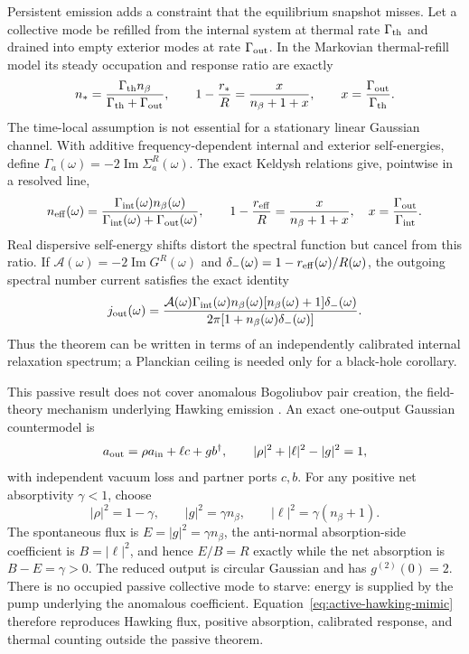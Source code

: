 \documentclass[12pt]{article}
\newcommand{\be}{\begin{equation}}
\newcommand{\ee}{\end{equation}}
\begin{document}
Persistent emission adds a constraint that the equilibrium snapshot
misses.  Let a collective mode be refilled from the internal system at
thermal rate $\Gamma_{\rm th}$ and drained into empty exterior modes at
rate $\Gamma_{\rm out}$.  In the Markovian thermal-refill model its
steady occupation and response ratio are exactly
\be
 n_* = \frac{\Gamma_{\rm th}n_\beta}
              {\Gamma_{\rm th}+\Gamma_{\rm out}},
 \qquad
 1-\frac{r_*}{R}
 =\frac{x}{n_\beta+1+x},
 \qquad
 x=\frac{\Gamma_{\rm out}}{\Gamma_{\rm th}}.
\label{eq:starvation}
\ee
The time-local assumption is not essential for a stationary linear
Gaussian channel.  With additive frequency-dependent internal and
exterior self-energies, define
$\Gamma_a(\omega)=-2\operatorname{Im}\Sigma_a^R(\omega)$.  The exact
Keldysh relations give, pointwise in a resolved line,
\be
 n_{\rm eff}(\omega)
 =\frac{\Gamma_{\rm int}(\omega)n_\beta(\omega)}
        {\Gamma_{\rm int}(\omega)+\Gamma_{\rm out}(\omega)},
 \qquad
 1-\frac{r_{\rm eff}}{R}
 =\frac{x}{n_\beta+1+x},
 \quad
 x=\frac{\Gamma_{\rm out}}{\Gamma_{\rm int}}.
\label{eq:spectral-starvation}
\ee
Real dispersive self-energy shifts distort the spectral function but
cancel from this ratio.  If $\mathcal A(\omega)=-2\operatorname{Im}
G^R(\omega)$ and
$\delta_-(\omega)=1-r_{\rm eff}(\omega)/R(\omega)$, the outgoing
spectral number current satisfies the exact identity
\be
 j_{\rm out}(\omega)
 =\frac{\mathcal A(\omega)\Gamma_{\rm int}(\omega)
 n_\beta(\omega)[n_\beta(\omega)+1]\delta_-(\omega)}
 {2\pi[1+n_\beta(\omega)\delta_-(\omega)]}.
\label{eq:spectral-current}
\ee
Thus the theorem can be written in terms of an independently calibrated
internal relaxation spectrum; a Planckian ceiling is needed only for a
black-hole corollary.

This passive result does not cover anomalous Bogoliubov pair creation, the
field-theory mechanism underlying Hawking emission
\cite{Hawking1975,Unruh1981}.  An
exact one-output Gaussian countermodel is
\be
 a_{\rm out}=\rho a_{\rm in}+\ell c+g b^\dagger,
 \qquad
 |\rho|^2+|\ell|^2-|g|^2=1,
\ee
with independent vacuum loss and partner ports $c,b$.  For any positive net
absorptivity $\gamma<1$, choose
\be
 |\rho|^2=1-\gamma,\qquad
 |g|^2=\gamma n_\beta,\qquad
 |\ell|^2=\gamma(n_\beta+1).
\label{eq:active-hawking-mimic}
\ee
The spontaneous flux is $E=|g|^2=\gamma n_\beta$, the anti-normal
absorption-side coefficient is $B=|\ell|^2$, and hence $E/B=R$ exactly while
the net absorption is $B-E=\gamma>0$.  The reduced output is circular Gaussian
and has $g^{(2)}(0)=2$.  There is no occupied passive collective mode to
starve: energy is supplied by the pump underlying the anomalous coefficient.
Equation~\eqref{eq:active-hawking-mimic} therefore reproduces Hawking flux,
positive absorption, calibrated response, and thermal counting outside the
passive theorem.
\end{document}
